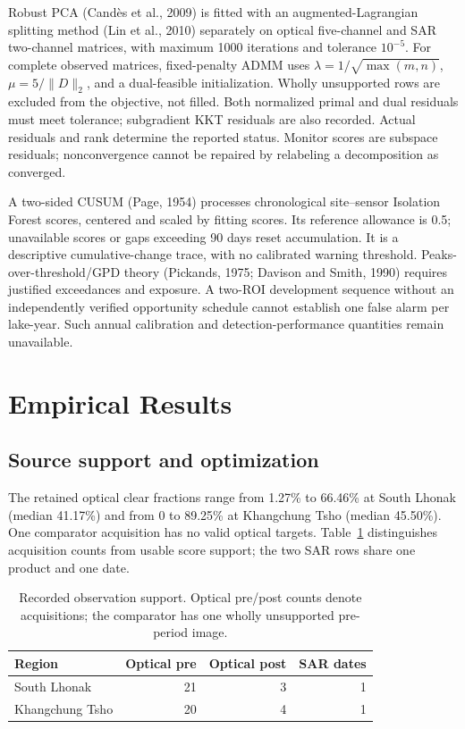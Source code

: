 \documentclass[10pt,twocolumn]{article}
\begin{document}
Robust PCA (Cand\`es et al., 2009) is fitted with an augmented-Lagrangian splitting method (Lin et al., 2010) separately on optical five-channel and SAR two-channel matrices, with maximum 1000 iterations and tolerance $10^{-5}$. For complete observed matrices, fixed-penalty ADMM uses $\lambda=1/\sqrt{\max(m,n)}$, $\mu=5/\|D\|_2$, and a dual-feasible initialization. Wholly unsupported rows are excluded from the objective, not filled. Both normalized primal and dual residuals must meet tolerance; subgradient KKT residuals are also recorded. Actual residuals and rank determine the reported status. Monitor scores are subspace residuals; nonconvergence cannot be repaired by relabeling a decomposition as converged.

A two-sided CUSUM (Page, 1954) processes chronological site--sensor Isolation Forest scores, centered and scaled by fitting scores. Its reference allowance is 0.5; unavailable scores or gaps exceeding 90 days reset accumulation. It is a descriptive cumulative-change trace, with no calibrated warning threshold. Peaks-over-threshold/GPD theory (Pickands, 1975; Davison and Smith, 1990) requires justified exceedances and exposure. A two-ROI development sequence without an independently verified opportunity schedule cannot establish one false alarm per lake-year. Such annual calibration and detection-performance quantities remain unavailable.

\section{Empirical Results}
\subsection{Source support and optimization}
The retained optical clear fractions range from 1.27\% to 66.46\% at South Lhonak (median 41.17\%) and from 0 to 89.25\% at Khangchung Tsho (median 45.50\%). One comparator acquisition has no valid optical targets. Table~\ref{tab:corpus} distinguishes acquisition counts from usable score support; the two SAR rows share one product and one date.

\begin{table}[t]\centering\small
\caption{Recorded observation support. Optical pre/post counts denote acquisitions; the comparator has one wholly unsupported pre-period image.}\label{tab:corpus}
\begin{tabular}{lrrr}\toprule
Region & Optical pre & Optical post & SAR dates\\\midrule
South Lhonak & 21 & 3 & 1\\
Khangchung Tsho & 20 & 4 & 1\\\bottomrule
\end{tabular}
\end{table}
\end{document}
